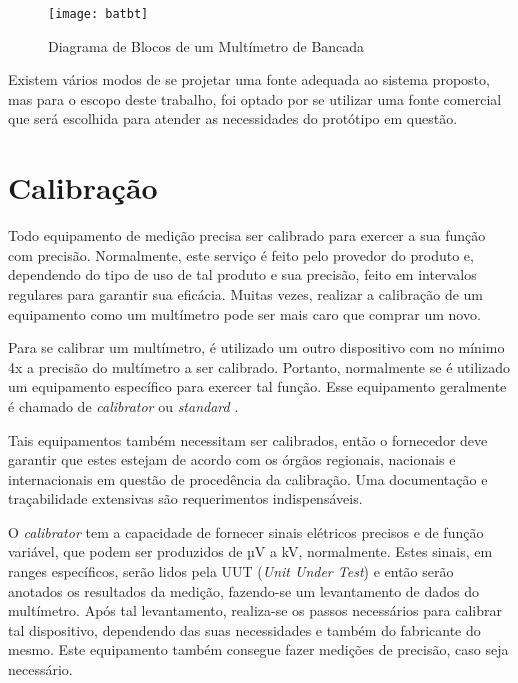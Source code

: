 \begin{figure}[htb!]%
    \caption{Diagrama de Blocos de um Multímetro de Bancada}%
    \label{fig:batbt}%
    \texttt{[image: batbt]}%
\end{figure}

Existem vários modos de se projetar uma fonte adequada ao sistema proposto, mas para o escopo deste trabalho, foi optado por se utilizar uma fonte comercial que será escolhida para atender as necessidades do protótipo em questão.

\section{Calibração}\label{sec:Calibration}

Todo equipamento de medição precisa ser calibrado para exercer a sua função com precisão. Normalmente, este serviço é feito pelo provedor do produto e, dependendo do tipo de uso de tal produto e sua precisão, feito em intervalos regulares para garantir sua eficácia. Muitas vezes, realizar a calibração de um equipamento como um multímetro pode ser mais caro que comprar um novo.

Para se calibrar um multímetro, é utilizado um outro dispositivo com no mínimo 4x a precisão do multímetro a ser calibrado. Portanto, normalmente se é utilizado um equipamento específico para exercer tal função. Esse equipamento geralmente é chamado de \textit{calibrator} ou \textit{standard} \cite{flukecalib}. %

Tais equipamentos também necessitam ser calibrados, então o fornecedor deve garantir que estes estejam de acordo com os órgãos regionais, nacionais e internacionais em questão de procedência da calibração. Uma documentação e traçabilidade extensivas são requerimentos indispensáveis.

O \textit{calibrator} tem a capacidade de fornecer sinais elétricos precisos e de função variável, que podem ser produzidos de µV a kV, normalmente. Estes sinais, em ranges específicos, serão lidos pela \gls{UUT} (\textit{Unit Under Test}) e então serão anotados os resultados da medição, fazendo-se um levantamento de dados do multímetro. Após tal levantamento, realiza-se os passos necessários para calibrar tal dispositivo, dependendo das suas necessidades e também do fabricante do mesmo. Este equipamento também consegue fazer medições de precisão, caso seja necessário.

